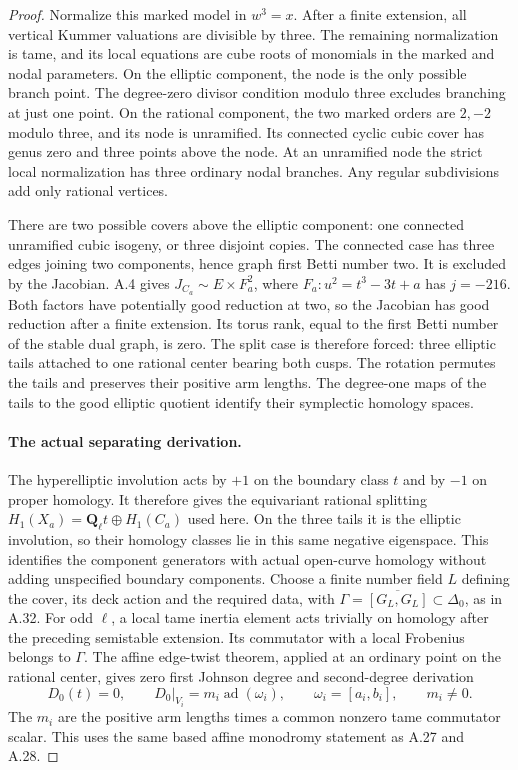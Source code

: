 \begin{proof}
Normalize this marked model in $w^3=x$.
After a finite extension, all vertical Kummer
valuations are divisible by three. The remaining
normalization is tame, and its local equations
are cube roots of monomials in the marked and
nodal parameters. On the elliptic component,
the node is the only possible branch point.
The degree-zero divisor condition modulo three
excludes branching at just one point. On the
rational component, the two marked orders are
$2,-2$ modulo three, and its node is unramified.
Its connected cyclic cubic cover has genus zero
and three points above the node. At an unramified
node the strict local normalization has three
ordinary nodal branches. Any regular subdivisions
add only rational vertices.

There are two possible covers above the elliptic
component: one connected unramified cubic isogeny,
or three disjoint copies. The connected case has
three edges joining two components, hence graph
first Betti number two. It is excluded by the
Jacobian. A.4 gives
$J_{C_a}\sim E\times F_a^2$, where
$F_a:u^2=t^3-3t+a$ has $j=-216$.
Both factors have potentially good reduction at
two, so the Jacobian has good reduction after a
finite extension. Its torus rank, equal to the
first Betti number of the stable dual graph,
is zero. The split case is therefore forced:
three elliptic tails attached to one rational
center bearing both cusps. The rotation permutes
the tails and preserves their positive arm
lengths. The degree-one maps of the tails to
the good elliptic quotient identify their
symplectic homology spaces.

\paragraph{The actual separating derivation.}
The hyperelliptic involution acts by $+1$ on the
boundary class $t$ and by $-1$ on proper homology.
It therefore gives the equivariant rational
splitting $H_1(X_a)=\mathbf Q_\ell t\oplus H_1(C_a)$
used here. On the three tails it is the elliptic
involution, so their homology classes lie in this
same negative eigenspace. This identifies the
component generators with actual open-curve
homology without adding unspecified boundary
components.
Choose a finite number field $L$ defining the
cover, its deck action and the required data,
with $\Gamma=\overline{[G_L,G_L]}\subset\Delta_0$,
as in A.32. For odd $\ell$, a local tame inertia
element acts trivially on homology after the
preceding semistable extension. Its commutator
with a local Frobenius belongs to $\Gamma$.
The affine edge-twist theorem, applied at an
ordinary point on the rational center, gives
zero first Johnson degree and second-degree
derivation
\[
 D_0(t)=0,\qquad
 D_0|_{V_i}=m_i\operatorname{ad}(\omega_i),\qquad
 \omega_i=[a_i,b_i],\qquad m_i\ne0.
\]
The $m_i$ are the positive arm lengths times a
common nonzero tame commutator scalar.
This uses the same based affine monodromy
statement as A.27 and A.28.


\end{proof}
